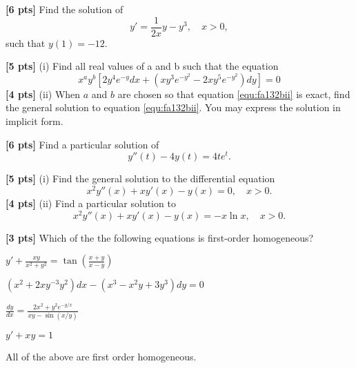 \documentclass[11pt]{article}
\begin{document}
\begin{problem}
\textbf{[6 pts]} Find the solution of  
\begin{equation*}
 y' = \frac{1}{2x} y − y^{ 3} ,\quad x > 0,
\end{equation*}
such that $y(1) = − 12 $. 
\end{problem}


\begin{problem}
\textbf{[5 pts]} (i) Find all real values of a and b such that the equation
\begin{equation} \tag{\textborn} \label{equ:fa132bii}
 x^{ a} y ^{b} \left[ 2y^{ 4} e ^{−y} dx + (xy ^{3} e ^{−y^{2}} − 2xy ^{5} e ^{−y^{2}}) dy \right] = 0 
\end{equation}
\textbf{[4 pts]} (ii) When $a$ and $b$ are chosen so that equation \eqref{equ:fa132bii} is exact, find the general solution to
equation \eqref{equ:fa132bii}. You may express the solution in implicit form.
\end{problem}


\begin{problem}
\textbf{[6 pts]} Find a particular solution of 
\begin{equation*}
y'' (t) − 4y(t) = 4te ^{t}.
\end{equation*}
\end{problem}



\begin{problem}
\textbf{[5 pts]} (i) Find the general solution to the differential equation
\begin{equation*}
 x^{ 2} y'' (x) + xy' (x) − y(x) = 0 ,\quad x > 0 .
\end{equation*} 
\textbf{[4 pts]} (ii) Find a particular solution to
\begin{equation*}
x ^{2} y'' (x) + xy' (x) − y(x) = −x \ln x ,\quad x > 0 .
\end{equation*}
\end{problem}



\begin{problem}
\textbf{[3 pts]} Which of the the following equations is first-order homogeneous?
\begin{multchoice}
     \item $y'+\frac{xy}{x^{2}+y^{2}} = \tan\left( \frac{x+y}{x-y} \right)$
     \item $(x ^{2} + 2xy ^{− 3}y ^{2}) dx − (x ^{3} − x ^{2} y + 3y ^{3}) dy = 0$
     \item $\frac{dy}{dx} = \frac{2x^{2}+y^{2}e^{-y/x}}{xy-\sin(x/y)}$
     \item $y'+xy =1$
     \item All of the above are first order homogeneous.
\end{multchoice}
\end{problem}
\end{document}
